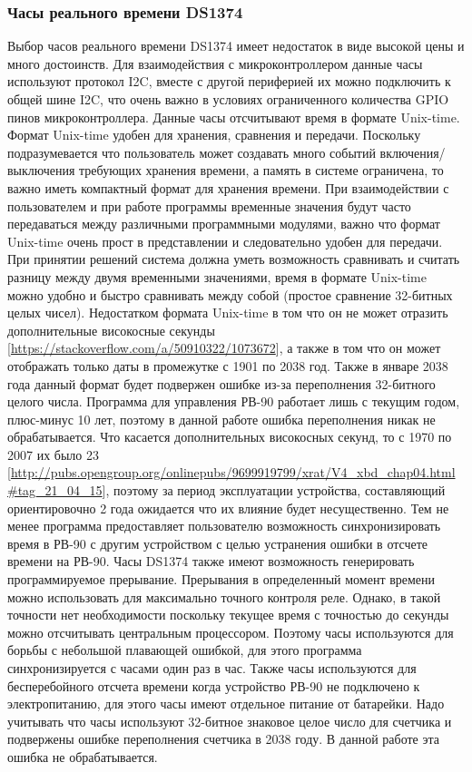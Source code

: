 \subsubsection{ Часы реального времени DS1374}
Выбор часов реального времени DS1374 имеет недостаток в виде высокой цены и много достоинств. 
Для взаимодействия с микроконтроллером данные часы используют протокол I2C, вместе с другой периферией их можно подключить к общей шине I2C, что очень важно в условиях ограниченного количества GPIO пинов  микроконтроллера.
Данные часы отсчитывают время в формате Unix-time. Формат Unix-time удобен для хранения, сравнения и передачи. Поскольку подразумевается что пользователь может создавать много событий включения/выключения требующих хранения времени, а память в системе ограничена, то важно иметь компактный формат для хранения времени. При взаимодействии с пользователем и при работе программы временные значения будут часто передаваться между различными программными модулями, важно что формат Unix-time очень прост в представлении и следовательно удобен для передачи. При принятии решений система должна уметь возможность сравнивать и считать разницу между двумя временными значениями, время в формате Unix-time можно удобно и быстро сравнивать между собой (простое сравнение 32-битных целых чисел). Недостатком формата Unix-time в том что он не может отразить дополнительные високосные секунды [\url{https://stackoverflow.com/a/50910322/1073672}], а также в том что он может отображать только даты в промежутке с 1901 по 2038 год. Также в январе 2038 года данный формат будет подвержен ошибке из-за переполнения 32-битного целого числа. Программа для управления РВ-90 работает лишь с текущим годом, плюс-минус 10 лет, поэтому в данной работе ошибка переполнения никак не обрабатывается. Что касается дополнительных високосных секунд, то с 1970 по 2007 их было 23 [\url{http://pubs.opengroup.org/onlinepubs/9699919799/xrat/V4_xbd_chap04.html#tag_21_04_15}], поэтому за период эксплуатации устройства, составляющий ориентировочно 2 года ожидается что их влияние будет несущественно. Тем не менее программа предоставляет пользователю возможность синхронизировать время в РВ-90 с другим устройством с целью устранения ошибки в отсчете времени на РВ-90. Часы DS1374 также имеют возможность генерировать программируемое прерывание.
Прерывания в определенный момент времени можно использовать для максимально точного контроля реле. Однако, в такой точности нет необходимости поскольку текущее время с точностью до секунды можно отсчитывать центральным процессором. Поэтому часы используются для борьбы с небольшой плавающей ошибкой, для этого программа синхронизируется с часами один раз в час. Также часы используются для бесперебойного отсчета времени когда устройство РВ-90 не подключено к электропитанию, для этого часы имеют отдельное питание от батарейки. Надо учитывать что часы используют 32-битное знаковое целое число для счетчика и подвержены ошибке переполнения счетчика в 2038 году. В данной работе эта ошибка не обрабатывается.  
